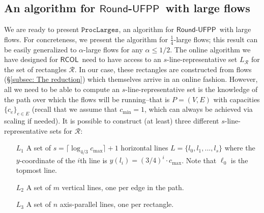 \documentclass[a4paper,UKenglish]{lipics-v2016}
\newcommand{\rufpp}{\mbox{$\mathsf{Round}$-$\mathsf{UFPP}$}}
\newcommand{\rcol}{\mbox{$\mathsf{RCOL}$}}
\theoremstyle{plain}
\newcommand{\cmax}{c_{\max}}
\newcommand{\cR}{\mathcal{R}}
\begin{document}
\subsection{An algorithm for \rufpp\ with large flows}
\label{subsec: Online algorithm for rufpp on 1/4-large instance}
We are ready to present $\mathtt{ProcLarges}$, an algorithm for \rufpp\ with large flows.  For concreteness, we present the algorithm for $\frac{1}{4}$-large flows; this result can be easily generalized to $\alpha$-large flows for any $\alpha \le 1/2$. 
The online algorithm we have designed for \rcol\ need to have access to an $s$-line-representative set $L_{\cR}$ for the set of rectangles $\cR$. In our case, these rectangles are constructed from flows (\S\ref{subsec: The reduction}) which themselves arrive in an online fashion. However, all we need to be able to compute an $s$-line-representative set is the knowledge of the path over which the flows will be running--that is $P=(V,E)$ with capacities $\{c_e\}_{e\in E}$ (recall that we assume that $c_{\min} = 1$, which can always be achieved via scaling if needed). It is possible to construct (at least) three  different $s$-line-representative sets for $\cR$: 

\begin{enumerate}
\item[$L_1$] A set of $s= \lceil  \log_{4/3} \cmax \rceil+1$ horizontal lines $L=\{l_0,l_1,...,l_s\}$ where the $y$-coordinate of the $i$th line is $y(l_i)= (3/4)^i\cdot\cmax$. Note that $\ell_0$ is the topmost line.
\item[$L_2$] A set of $m$ vertical lines, one per edge in the path.
\item[$L_3$] A set of $n$ axis-parallel lines, one per rectangle.
\end{enumerate}
\end{document}
